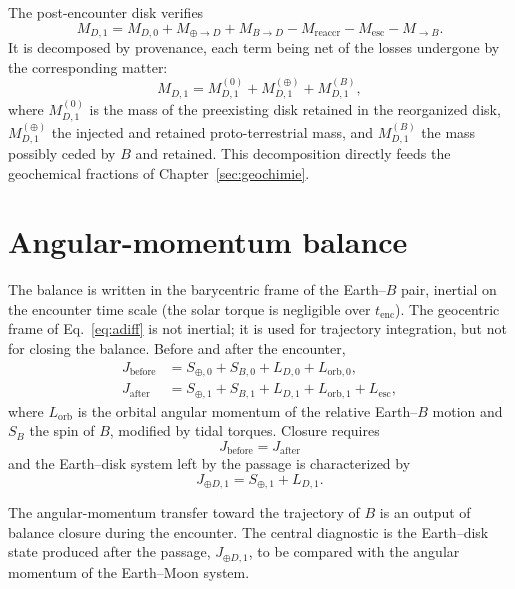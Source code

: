 \documentclass[11pt,a4paper,openany]{report}
\begin{document}
The post-encounter disk verifies
\begin{equation}
M_{D,1}=M_{D,0}+M_{\oplus\to D}+M_{B\to D}-M_{\mathrm{reaccr}}-M_{\mathrm{esc}}-M_{\to B}.
\label{eq:bilanM1}
\end{equation}
It is decomposed by provenance, each term being net of the losses undergone by the corresponding
matter:
\begin{equation}
M_{D,1}=M_{D,1}^{(0)}+M_{D,1}^{(\oplus)}+M_{D,1}^{(B)},
\label{eq:provenance}
\end{equation}
where $M_{D,1}^{(0)}$ is the mass of the preexisting disk retained in the reorganized disk,
$M_{D,1}^{(\oplus)}$ the injected and retained proto-terrestrial mass, and $M_{D,1}^{(B)}$ the mass
possibly ceded by $B$ and retained. This decomposition directly feeds the geochemical fractions of
Chapter~\ref{sec:geochimie}.

\section{Angular-momentum balance}

The balance is written in the barycentric frame of the Earth--$B$ pair, inertial on the encounter
time scale (the solar torque is negligible over $t_{\mathrm{enc}}$). The geocentric frame of
Eq.~\eqref{eq:adiff} is not inertial; it is used for trajectory integration, but not for closing the
balance. Before and after the encounter,
\begin{align}
J_{\mathrm{before}}&=S_{\oplus,0}+S_{B,0}+L_{D,0}+L_{\mathrm{orb},0},
\label{eq:Javant}\\
J_{\mathrm{after}}&=S_{\oplus,1}+S_{B,1}+L_{D,1}+L_{\mathrm{orb},1}+L_{\mathrm{esc}},
\label{eq:Japres}
\end{align}
where $L_{\mathrm{orb}}$ is the orbital angular momentum of the relative Earth--$B$ motion and $S_B$
the spin of $B$, modified by tidal torques. Closure requires
\begin{equation}
\boxed{\;J_{\mathrm{before}}=J_{\mathrm{after}}\;}
\label{eq:fermeture}
\end{equation}
and the Earth--disk system left by the passage is characterized by
\begin{equation}
J_{\oplus D,1}=S_{\oplus,1}+L_{D,1}.
\label{eq:J1}
\end{equation}

\begin{controle}
The angular-momentum transfer toward the trajectory of $B$ is an output of balance closure during
the encounter. The central diagnostic is the Earth--disk state produced after the passage,
$J_{\oplus D,1}$, to be compared with the angular momentum of the Earth--Moon system.
\end{controle}
\end{document}
